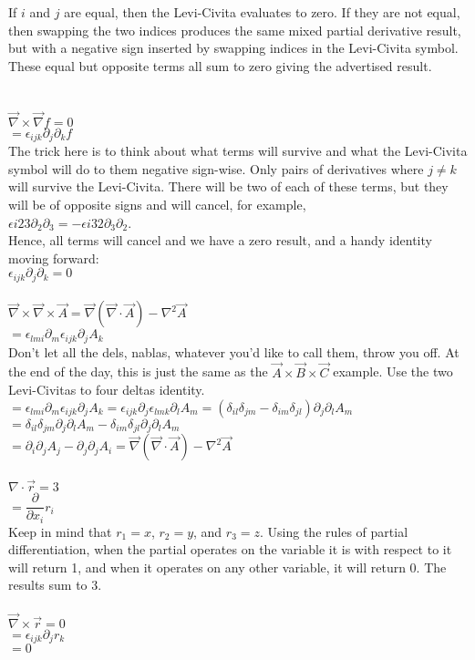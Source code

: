 \documentclass[prb,preprint]
{revtex4-1}
\newcommand{\PRLsep}{\noindent\makebox[\linewidth]{\resizebox{0.8888\linewidth}{2pt}{$\bullet$}}\bigskip}
\begin{document}
If $i$ and $j$ are equal, then the Levi-Civita evaluates to zero.  If they are not equal, then swapping the two indices produces the same mixed partial derivative result, but with a negative sign inserted by swapping indices in the Levi-Civita symbol.  These equal but opposite terms all sum to zero giving the advertised result.
\\\\
\PRLsep
\\
$\vec{\nabla} \times \vec{\nabla}f = 0$
\\
$= \epsilon_{ijk} \partial_j \partial_k f$
\\
The trick here is to think about what terms will survive and what the Levi-Civita symbol will do to them negative sign-wise.  Only pairs of derivatives where $j \ne k$ will survive the Levi-Civita.  There will be two of each of these terms, but they will be of opposite signs and will cancel, for example,
\\
$\epsilon{i23}\partial_2 \partial_3 = -\epsilon{i32}\partial_3 \partial_2$.
\\
Hence, all terms will cancel and we have a zero result, and a handy identity moving forward:
\\
$\epsilon_{ijk}\partial_j\partial_k = 0$
\\
\PRLsep
\\
$\vec{\nabla} \times \vec{\nabla} \times \vec{A} = \vec{\nabla}\left(\vec{\nabla} \cdot \vec{A}\right) - \nabla^2 \vec{A}$
\\
$= \epsilon_{lmi} \partial_m \epsilon_{ijk} \partial_j A_k$
\\
Don't let all the dels, nablas, whatever you'd like to call them, throw you off.  At the end of the day, this is just the same as the $\vec{A} \times \vec{B} \times \vec{C}$ example.  Use the two Levi-Civitas to four deltas identity.\\
$= \epsilon_{lmi} \partial_m \epsilon_{ijk} \partial_j A_k = \epsilon_{ijk} \partial_j \epsilon_{lmk} \partial_l A_m  = \left(\delta_{il}\delta_{jm} - \delta_{im}\delta_{jl}\right)\partial_j\partial_l A_m$
\\
$=\delta_{il}\delta_{jm}\partial_j\partial_l A_m - \delta_{im}\delta_{jl}\partial_j\partial_l A_m$
\\
$= \partial_i \partial_j A_j - \partial_j \partial_j A_i = \vec{\nabla}\left(\vec{\nabla}\cdot \vec{A}\right) - \nabla^2 \vec{A}$
\\
\PRLsep
\\
$\nabla \cdot \vec{r} = 3$\\
$= \dfrac{\partial}{\partial x_i} r_i$\\
Keep in mind that $r_1 = x$, $r_2 = y$, and $r_3 = z$.  Using the rules of partial differentiation, when the partial operates on the variable it is with respect to it will return 1, and when it operates on any other variable, it will return 0.  The results sum to 3.
\\
\PRLsep
\\
$\vec{\nabla} \times \vec{r} = 0$\\
$=\epsilon_{ijk} \partial_j r_k$\\
$= 0$
\end{document}
